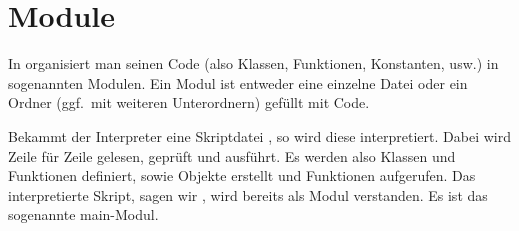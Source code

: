 \section{Module}
\label{section:module}
In \Python organisiert man seinen Code (also Klassen, Funktionen, Konstanten, usw.) in sogenannten Modulen.
Ein Modul ist entweder eine einzelne Datei oder ein Ordner (ggf.\ mit weiteren Unterordnern) gefüllt mit \Python Code.

Bekammt der Interpreter eine Skriptdatei , so wird diese interpretiert.
Dabei wird Zeile für Zeile gelesen, geprüft und ausführt.
Es werden also Klassen und Funktionen definiert, sowie Objekte erstellt und Funktionen aufgerufen.
Das interpretierte Skript, sagen wir , wird bereits als Modul verstanden.
Es ist das sogenannte main-Modul.





